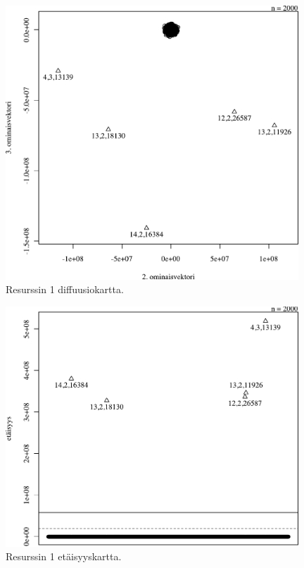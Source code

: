 \begin{figure}[p]
\centering
\includegraphics[width=11cm]{pics/diffuusiokuvat/service_1.pdf}
\caption{Resurssin 1 diffuusiokartta.}
\label{diffusio_1}
\end{figure}

\begin{figure}[p]
\centering
\includegraphics[width=11cm]{pics/tiheyskuvat/service_1.pdf}
\caption{Resurssin 1 etäisyyskartta.}
\label{service_1}
\end{figure}

